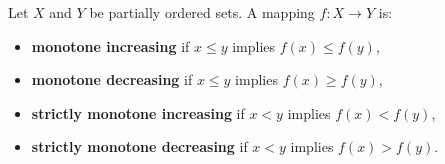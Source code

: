 Let $X$ and $Y$ be partially ordered sets. A mapping $f : X \to Y$ is:
\begin{itemize}
\item \textbf{monotone increasing} if $x \leq y$ implies $f(x) \leq f(y)$,
\item \textbf{monotone decreasing} if $x \leq y$ implies $f(x) \geq f(y)$,
\item \textbf{strictly monotone increasing} if $x < y$ implies $f(x) < f(y)$,
\item \textbf{strictly monotone decreasing} if $x < y$ implies $f(x) > f(y)$.
\end{itemize}
